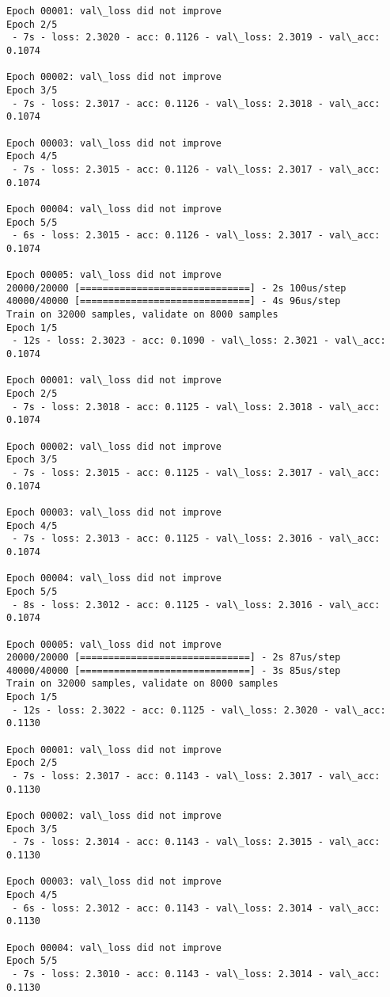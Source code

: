 \documentclass[11pt]{article}
\begin{document}
\begin{Verbatim}[commandchars=\\\{\}]
Epoch 00001: val\_loss did not improve
Epoch 2/5
 - 7s - loss: 2.3020 - acc: 0.1126 - val\_loss: 2.3019 - val\_acc: 0.1074

Epoch 00002: val\_loss did not improve
Epoch 3/5
 - 7s - loss: 2.3017 - acc: 0.1126 - val\_loss: 2.3018 - val\_acc: 0.1074

Epoch 00003: val\_loss did not improve
Epoch 4/5
 - 7s - loss: 2.3015 - acc: 0.1126 - val\_loss: 2.3017 - val\_acc: 0.1074

Epoch 00004: val\_loss did not improve
Epoch 5/5
 - 6s - loss: 2.3015 - acc: 0.1126 - val\_loss: 2.3017 - val\_acc: 0.1074

Epoch 00005: val\_loss did not improve
20000/20000 [==============================] - 2s 100us/step
40000/40000 [==============================] - 4s 96us/step
Train on 32000 samples, validate on 8000 samples
Epoch 1/5
 - 12s - loss: 2.3023 - acc: 0.1090 - val\_loss: 2.3021 - val\_acc: 0.1074

Epoch 00001: val\_loss did not improve
Epoch 2/5
 - 7s - loss: 2.3018 - acc: 0.1125 - val\_loss: 2.3018 - val\_acc: 0.1074

Epoch 00002: val\_loss did not improve
Epoch 3/5
 - 7s - loss: 2.3015 - acc: 0.1125 - val\_loss: 2.3017 - val\_acc: 0.1074

Epoch 00003: val\_loss did not improve
Epoch 4/5
 - 7s - loss: 2.3013 - acc: 0.1125 - val\_loss: 2.3016 - val\_acc: 0.1074

Epoch 00004: val\_loss did not improve
Epoch 5/5
 - 8s - loss: 2.3012 - acc: 0.1125 - val\_loss: 2.3016 - val\_acc: 0.1074

Epoch 00005: val\_loss did not improve
20000/20000 [==============================] - 2s 87us/step
40000/40000 [==============================] - 3s 85us/step
Train on 32000 samples, validate on 8000 samples
Epoch 1/5
 - 12s - loss: 2.3022 - acc: 0.1125 - val\_loss: 2.3020 - val\_acc: 0.1130

Epoch 00001: val\_loss did not improve
Epoch 2/5
 - 7s - loss: 2.3017 - acc: 0.1143 - val\_loss: 2.3017 - val\_acc: 0.1130

Epoch 00002: val\_loss did not improve
Epoch 3/5
 - 7s - loss: 2.3014 - acc: 0.1143 - val\_loss: 2.3015 - val\_acc: 0.1130

Epoch 00003: val\_loss did not improve
Epoch 4/5
 - 6s - loss: 2.3012 - acc: 0.1143 - val\_loss: 2.3014 - val\_acc: 0.1130

Epoch 00004: val\_loss did not improve
Epoch 5/5
 - 7s - loss: 2.3010 - acc: 0.1143 - val\_loss: 2.3014 - val\_acc: 0.1130


\end{Verbatim}
\end{document}
